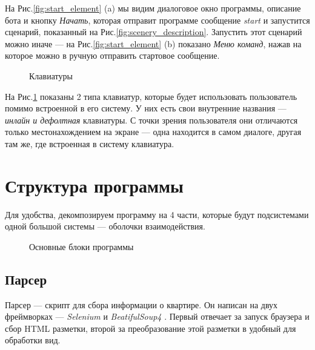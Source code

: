 \documentclass{article}
\begin{document}
		На Рис.\ref{fig:start_element} (a) мы видим диалоговое окно программы, описание бота и кнопку \textit{Начать}, которая отправит программе сообщение \textit{start} и запустится сценарий, показанный на Рис.\ref{fig:scenery_description}. Запустить этот сценарий можно иначе --- на Рис.\ref{fig:start_element} (b) показано \textit{Меню команд}, нажав на которое можно в ручную отправить стартовое сообщение.
		
		\begin{figure}[H]
			\centering
			\hfill %
			\caption{Клавиатуры}
			\label{fig:keyboard}
		\end{figure}
		
		На Рис.\ref{fig:keyboard} показаны 2 типа клавиатур, которые будет использовать пользователь помимо встроенной в его систему. У них есть свои внутренние названия --- \textit{инлайн и дефолтная} клавиатуры. С точки зрения пользователя они отличаются только местонахождением на экране --- одна находится в самом диалоге, другая там же, где встроенная в систему клавиатура.
		

	\newpage
	\section {Структура программы}
	
		Для удобства, декомпозируем программу на 4 части, которые будут подсистемами одной большой системы --- оболочки взаимодействия.
		
		\begin{figure}[H]
			\centering
			\caption{Основные блоки программы}
			\label{fig:all_modules}
		\end{figure}
	
		\subsection{Парсер}
		
			Парсер --- скрипт для сбора информации о квартире. Он написан на двух фреймворках --- \textit{Selenium} \cite{litlink8} и \textit{BeatifulSoup4} \cite{litlink9}. Первый отвечает за запуск браузера и сбор HTML разметки, второй за преобразование этой разметки в удобный для обработки вид.
			
\end{document}
